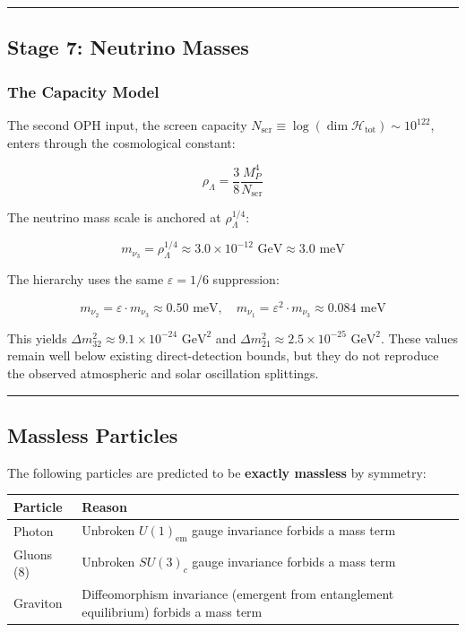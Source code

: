 \begin{center}\rule{0.5\linewidth}{0.5pt}\end{center}

\subsection{Stage 7: Neutrino Masses}\label{8-stage-7-neutrino-masses}

\subsubsection{The Capacity Model}\label{81-the-capacity-model}

The second OPH input, the screen capacity \(N_{\mathrm{scr}} \equiv \log(\dim\mathcal{H}_{\text{tot}}) \sim 10^{122}\), enters through the cosmological constant:

\[\rho_\Lambda = \frac{3}{8} \frac{M_P^4}{N_{\mathrm{scr}}}\]

The neutrino mass scale is anchored at \(\rho_\Lambda^{1/4}\):

\[m_{\nu_3} = \rho_\Lambda^{1/4} \approx 3.0 \times 10^{-12} \text{ GeV} \approx 3.0 \text{ meV}\]

The hierarchy uses the same \(\varepsilon = 1/6\) suppression:

\[m_{\nu_2} = \varepsilon \cdot m_{\nu_3} \approx 0.50 \text{ meV}, \quad m_{\nu_1} = \varepsilon^2 \cdot m_{\nu_3} \approx 0.084 \text{ meV}\]

This yields \(\Delta m_{32}^2 \approx 9.1 \times 10^{-24} \text{ GeV}^2\) and \(\Delta m_{21}^2 \approx 2.5 \times 10^{-25} \text{ GeV}^2\). These values remain well below existing direct-detection bounds, but they do not reproduce the observed atmospheric and solar oscillation splittings.

\begin{center}\rule{0.5\linewidth}{0.5pt}\end{center}

\subsection{Massless Particles}\label{9-massless-particles}

The following particles are predicted to be \textbf{exactly massless} by symmetry:

{\def\LTcaptype{none} %
\begin{longtable}[]{@{}>{\RaggedRight\arraybackslash}p{}>{\RaggedRight\arraybackslash}p{}@{}}
\toprule\noalign{}
Particle & Reason \\
\midrule\noalign{}
\endhead
\bottomrule\noalign{}
\endlastfoot
Photon & Unbroken \(U(1)_{\text{em}}\) gauge invariance forbids a mass term \\
Gluons (8) & Unbroken \(SU(3)_c\) gauge invariance forbids a mass term \\
Graviton & Diffeomorphism invariance (emergent from entanglement equilibrium) forbids a mass term \\
\end{longtable}
}

